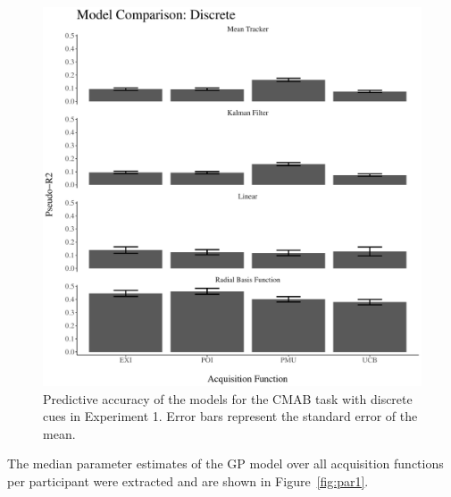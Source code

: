 \documentclass[a4paper,natbib]{apa6}
\begin{document}
%
\begin{figure}[ht!]
\centering
\includegraphics[scale=0.55]{modelcomparison1.pdf}
\caption{Predictive accuracy of the models for the CMAB task with discrete cues in Experiment 1. Error bars represent the standard error of the mean.}
\label{fig:results1}
\end{figure}
%
The median parameter estimates of the GP model over all acquisition functions per participant were extracted and are shown in Figure~\ref{fig:par1}. 
%
\end{document}
